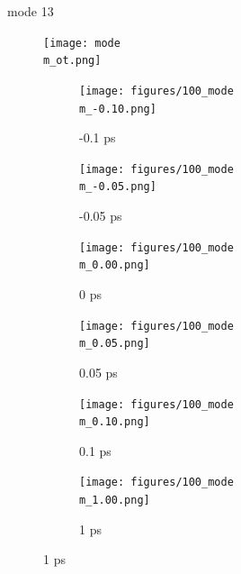 \documentclass{beamer}
\newcommand\w{0.32}
\begin{document}
\renewcommand\m{13}
\begin{frame}{mode \m}
		\vspace{\vh mm}
	\begin{figure}
		\centering
		\texttt{[image: mode\\m\_ot.png]}
	\end{figure}
	\begin{figure}
		\centering
		\begin{subfigure}[b]{\w\textwidth}
			\centering
			\texttt{[image: figures/100\_mode\\m\_-0.10.png]}
			\caption{-0.1 ps}
		\end{subfigure}
		\begin{subfigure}[b]{\w\textwidth}
			\centering
			\texttt{[image: figures/100\_mode\\m\_-0.05.png]}
			\caption{-0.05 ps}
		\end{subfigure}
		\begin{subfigure}[b]{\w\textwidth}
			\centering
			\texttt{[image: figures/100\_mode\\m\_0.00.png]}
			\caption{0 ps}
		\end{subfigure}
		\begin{subfigure}[b]{\w\textwidth}
			\centering
			\texttt{[image: figures/100\_mode\\m\_0.05.png]}
			\caption{0.05 ps}
		\end{subfigure}
		\begin{subfigure}[b]{\w\textwidth}
			\centering
			\texttt{[image: figures/100\_mode\\m\_0.10.png]}
			\caption{0.1 ps}
		\end{subfigure}
		\begin{subfigure}[b]{\w\textwidth}
			\centering
			\texttt{[image: figures/100\_mode\\m\_1.00.png]}
			\caption{1 ps}
		\end{subfigure}
	\end{figure}
\end{frame}
\end{document}
